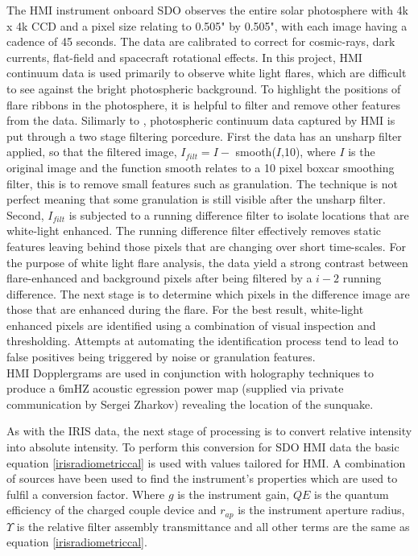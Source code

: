 The HMI instrument onboard SDO observes the entire solar photosphere with 4k x 4k CCD and a pixel size relating to 0.505" by 0.505", with each image having a cadence of 45 seconds. The data are calibrated to correct for cosmic-rays, dark currents, flat-field and spacecraft rotational effects. In this project, HMI continuum data is used primarily to observe white light flares, which are difficult to see against the bright photospheric background. To highlight the positions of flare ribbons in the photosphere, it is helpful to filter and remove other features from the data. Silimarly to \cite{2014ApJ...783...98K}, photospheric continuum data captured by HMI is put through a two stage filtering porcedure. First the data has an unsharp filter applied, so that the filtered image, $I_{filt}=I-$ smooth($I$,10), where $I$ is the original image and the function smooth relates to a 10 pixel boxcar smoothing filter, this is to remove small features such as granulation. The technique is not perfect meaning that some granulation is still visible after the unsharp filter. Second, $I_{filt}$ is subjected to a running difference filter to isolate locations that are white-light enhanced. The running difference filter effectively removes static features leaving behind those pixels that are changing over short time-scales. For the purpose of white light flare analysis, the data yield a strong contrast between flare-enhanced and background pixels after being filtered by a $i-2$ running difference. The next stage is to determine which pixels in the difference image are those that are enhanced during the flare. For the best result, white-light enhanced pixels are identified using a combination of visual inspection and thresholding. Attempts at automating the identification process tend to lead to false positives being triggered by noise or granulation features. \\
HMI Dopplergrams are used in conjunction with holography techniques to produce a 6mHZ acoustic egression power map (supplied via private communication by Sergei Zharkov) revealing the location of the sunquake. 

As with the IRIS data, the next stage of processing is to convert relative intensity into absolute intensity. To perform this conversion for SDO HMI data the basic equation \ref{irisradiometriccal} is used with values tailored for HMI. A combination of sources \citep{2012SoPh..275...41B, 2012SoPh..275..285C} have been used to find the instrument's properties which are used to fulfil a conversion factor. Where $g$ is the instrument gain, $QE$ is the quantum efficiency of the charged couple device and $r_{ap}$ is the instrument aperture radius, $\Upsilon$ is the relative filter assembly transmittance and all other terms are the same as equation \ref{irisradiometriccal}.



